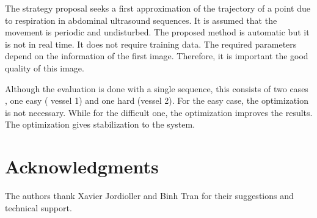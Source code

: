 \documentclass[10pt,a4paper,report]{article}
\begin{document}
The strategy proposal seeks a first approximation of the trajectory of a point due to respiration in abdominal ultrasound sequences. It is assumed that the movement is periodic and undisturbed. The proposed method is automatic but it is not in real time. It does not require training data. The required parameters depend on the information of the first image. Therefore, it is important the good quality of  this image.

Although the evaluation is done with a single sequence, this consists of two cases , one easy ( vessel 1) and one hard (vessel 2). For the easy case, the optimization is not necessary. While for the difficult one, the optimization improves the results. The optimization gives stabilization to the system.


\section*{Acknowledgments}
The authors thank Xavier Jordioller and Binh Tran for their suggestions and technical support.





\end{document}
